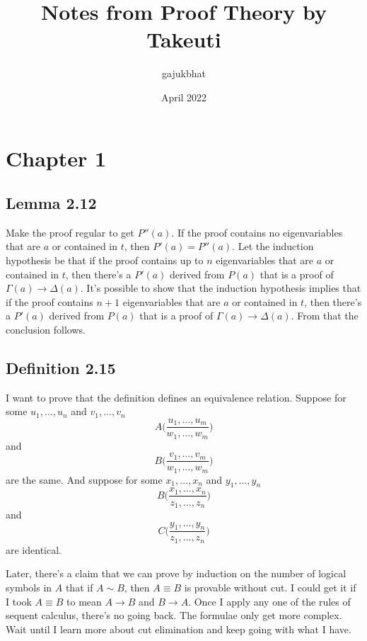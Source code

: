 \documentclass{article}
\title{Notes from Proof Theory by Takeuti}
\author{gajukbhat}
\date{April 2022}
\begin{document}
\maketitle

\section{Chapter 1}
\subsection{Lemma 2.12}
Make the proof regular to get \(P''(a)\). If the proof contains no eigenvariables that are \(a\) or contained in \(t\), then \(P'(a) = P''(a)\).
Let the induction hypothesis be that if the proof contains up to \(n\) eigenvariables that are \(a\) or contained in \(t\), then there's a \(P'(a)\) derived from \(P(a)\) that is a proof of \(\Gamma(a) \rightarrow \Delta(a)\). It's possible to show that the induction hypothesis implies that if the proof contains \(n + 1\) eigenvariables that are \(a\) or contained in \(t\), then there's a \(P'(a)\) derived from \(P(a)\) that is a proof of \(\Gamma(a) \rightarrow \Delta(a)\).
From that the conclusion follows.

\subsection{Definition 2.15}
I want to prove that the definition defines an equivalence relation. Suppose for some \(u_1, \ldots, u_n\) and \(v_1, \ldots, v_n\)
\[
    A\biggl(\frac{u_1, \ldots, u_m}{w_1, \ldots, w_m}\biggr)
\]
and
\[
    B\biggl(\frac{v_1, \ldots, v_m}{w_1, \ldots, w_m}\biggr)
\]
are the same. And suppose for some \(x_1, \ldots, x_n\) and \(y_1, \ldots, y_n\)
\[
    B\biggl(\frac{x_1, \ldots, x_n}{z_1, \ldots, z_n}\biggr)
\]
and
\[
    C\biggl(\frac{y_1, \ldots, y_n}{z_1, \ldots, z_n}\biggr)
\]
are identical.

Later, there's a claim that we can prove by induction on the number of logical symbols in \(A\) that if \(A \sim B\), then \(A \equiv B\) is provable without cut.
I could get it if I took \(A \equiv B\) to mean \(A \rightarrow B\) and \(B \rightarrow A\).
Once I apply any one of the rules of sequent calculus, there's no going back. The formulae only get more complex.
Wait until I learn more about cut elimination and keep going with what I have.
\end{document}
